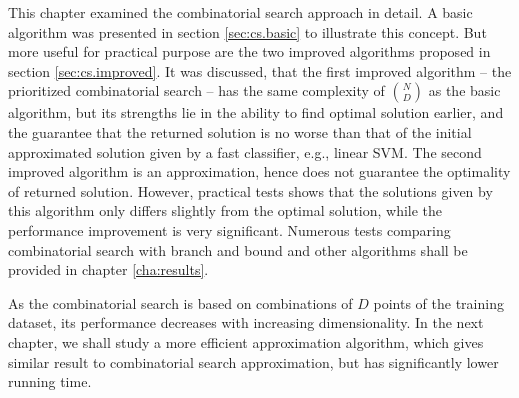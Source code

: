 This chapter examined the combinatorial search approach in detail. A basic algorithm was presented in section \ref{sec:cs.basic} to illustrate this concept. But more useful for practical purpose are the two improved algorithms proposed in section \ref{sec:cs.improved}. It was discussed, that the first improved algorithm -- the prioritized combinatorial search -- has the same complexity of ${N \choose D}$ as the basic algorithm, but its strengths lie in the ability to find optimal solution earlier, and the guarantee that the returned solution is no worse than that of the initial approximated solution given by a fast classifier, e.g., linear SVM. The second improved algorithm is an approximation, hence does not guarantee the optimality of returned solution. However, practical tests shows that the solutions given by this algorithm only differs slightly from the optimal solution, while the performance improvement is very significant. Numerous tests comparing combinatorial search with branch and bound and other algorithms shall be provided in chapter \ref{cha:results}.

As the combinatorial search is based on combinations of $D$ points of the training dataset, its performance decreases with increasing dimensionality. In the next chapter, we shall study a more efficient approximation algorithm, which gives similar result to combinatorial search approximation, but has significantly lower running time. 

